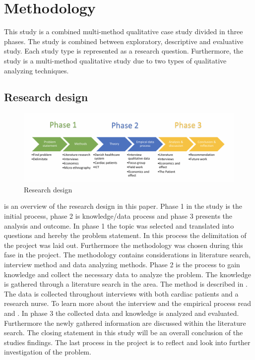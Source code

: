 \chapter{Methodology}

This study is a combined multi-method qualitative case study divided in three phases.
The study is combined between exploratory, descriptive and evaluative study. Each study type is represented as a research question. Furthermore, the study is a multi-method qualitative study due to two types of qualitative analyzing techniques. 
\section{Research design}

\begin{figure}[H]
\centering
\includegraphics[width=1.10\textwidth]{Figure/researchdesign.png}
\caption{Research design}
\label{fig:Researchdesign}
\end{figure} 

 is an overview of the research design in this paper.
 Phase 1 in the study is the initial process, phase 2 is knowledge/data process and phase 3 presents the analysis and outcome.
In phase 1 the topic was selected and translated into questions and hereby the problem statement. In this process the delimitation of the project was laid out. Furthermore the methodology was chosen during this fase in the project. The methodology contains considerations in literature search, interview method and data analyzing methods. 
Phase 2 is the process to gain knowledge and collect the necessary data to analyze the problem. The knowledge is gathered through a literature search in the area. The method is described in . The data is collected throughout interviews with both cardiac patients and a research nurse. To learn more about the interview and the empirical process read  and .
In phase 3 the collected data and knowledge is analyzed and evaluated. Furthermore the newly gathered information are discussed within the literature search. The closing statement in this study will be an overall conclusion of the studies findings. The last process in the project is to reflect and look into further investigation of the problem. 


